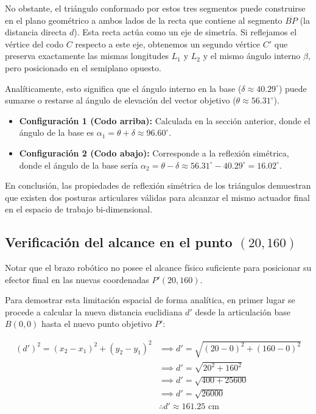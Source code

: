 \documentclass[12pt]{article}
\begin{document}
No obstante, el triángulo conformado por estos tres segmentos puede construirse en el plano geométrico a ambos lados de la recta que contiene al segmento $\overline{BP}$ (la distancia directa $d$). Esta recta actúa como un eje de simetría. Si reflejamos el vértice del codo $C$ respecto a este eje, obtenemos un segundo vértice $C'$ que preserva exactamente las mismas longitudes $L_1$ y $L_2$ y el mismo ángulo interno $\beta$, pero posicionado en el semiplano opuesto.

Analíticamente, esto significa que el ángulo interno en la base ($\delta \approx 40.29^\circ$) puede sumarse o restarse al ángulo de elevación del vector objetivo ($\theta \approx 56.31^\circ$). 
\begin{itemize}
    \item \textbf{Configuración 1 (Codo arriba):} Calculada en la sección anterior, donde el ángulo de la base es $\alpha_1 = \theta + \delta \approx 96.60^\circ$.
    \item \textbf{Configuración 2 (Codo abajo):} Corresponde a la reflexión simétrica, donde el ángulo de la base sería $\alpha_2 = \theta - \delta \approx 56.31^\circ - 40.29^\circ = 16.02^\circ$.
\end{itemize}

En conclusión, las propiedades de reflexión simétrica de los triángulos demuestran que existen dos posturas articulares válidas para alcanzar el mismo actuador final en el espacio de trabajo bi-dimensional.

\subsection{Verificación del alcance en el punto $(20, 160)$}

Notar que el brazo robótico no posee el alcance físico suficiente para posicionar su efector final en las nuevas coordenadas $P'(20, 160)$. 

\newpage

Para demostrar esta limitación espacial de forma analítica, en primer lugar se procede a calcular la nueva distancia euclidiana $d'$ desde la articulación base $B(0,0)$ hasta el nuevo punto objetivo $P'$:

\begin{align*}
    (d')^2 = (x_2 - x_1)^2 + (y_2 - y_1)^2 &\implies d' = \sqrt{(20 - 0)^2 + (160 - 0)^2} \\
    &\implies d' = \sqrt{20^2 + 160^2} \\
    &\implies d' = \sqrt{400 + 25600} \\
    &\implies d' = \sqrt{26000} \\
    &\therefore d' \approx 161.25 \text{ cm}
\end{align*}
\end{document}
